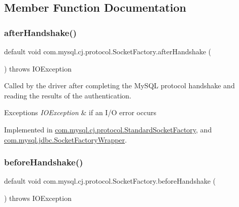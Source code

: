 \subsection{Member Function Documentation}
\mbox{\label{interfacecom_1_1mysql_1_1cj_1_1protocol_1_1_socket_factory_acfbef33f9924346f5fbfc476bf0667d9}} 
\subsubsection{\texorpdfstring{after\+Handshake()}{afterHandshake()}}
{\footnotesize\ttfamily default void com.\+mysql.\+cj.\+protocol.\+Socket\+Factory.\+after\+Handshake (\begin{DoxyParamCaption}{ }\end{DoxyParamCaption}) throws I\+O\+Exception}

Called by the driver after completing the My\+S\+QL protocol handshake and reading the results of the authentication.


\begin{DoxyExceptions}{Exceptions}
{\em I\+O\+Exception} & if an I/O error occurs \\
\hline
\end{DoxyExceptions}


Implemented in \mbox{\hyperlink{classcom_1_1mysql_1_1cj_1_1protocol_1_1_standard_socket_factory_a3d55f3b14d5d46d75ab93c88a339a72a}{com.\+mysql.\+cj.\+protocol.\+Standard\+Socket\+Factory}}, and \mbox{\hyperlink{classcom_1_1mysql_1_1jdbc_1_1_socket_factory_wrapper_ab7dde0fd740255950d83759b418fd2ff}{com.\+mysql.\+jdbc.\+Socket\+Factory\+Wrapper}}.

\mbox{\label{interfacecom_1_1mysql_1_1cj_1_1protocol_1_1_socket_factory_afc456b268ae05cf284598c3acc33829f}} 
\subsubsection{\texorpdfstring{before\+Handshake()}{beforeHandshake()}}
{\footnotesize\ttfamily default void com.\+mysql.\+cj.\+protocol.\+Socket\+Factory.\+before\+Handshake (\begin{DoxyParamCaption}{ }\end{DoxyParamCaption}) throws I\+O\+Exception}

